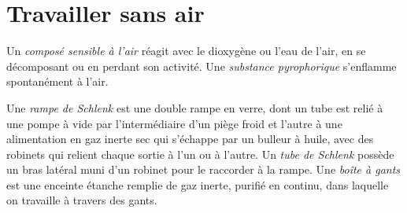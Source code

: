 \section{Travailler sans air}

\begin{definition}\label{def:b3:lab-techniques-3:air-sensitive}
Un \emph{composé sensible à l'air} réagit avec le
dioxygène ou l'eau de l'air, en se décomposant ou en perdant son activité.
Une \emph{substance pyrophorique} s'enflamme
spontanément à l'air.
\end{definition}

\begin{definition}\label{def:b3:lab-techniques-3:schlenk}
Une \emph{rampe de Schlenk} est une double rampe
en verre, dont un tube est relié à une pompe à vide par l'intermédiaire
d'un piège froid et l'autre à une alimentation en gaz inerte sec qui
s'échappe par un bulleur à huile, avec des robinets qui relient chaque
sortie à l'un ou à l'autre. Un \emph{tube de Schlenk} possède un bras
latéral muni d'un robinet pour le raccorder à la rampe. Une \emph{boîte à gants} est une enceinte
étanche remplie de gaz inerte, purifié en continu, dans laquelle on
travaille à travers des gants.
\end{definition}

